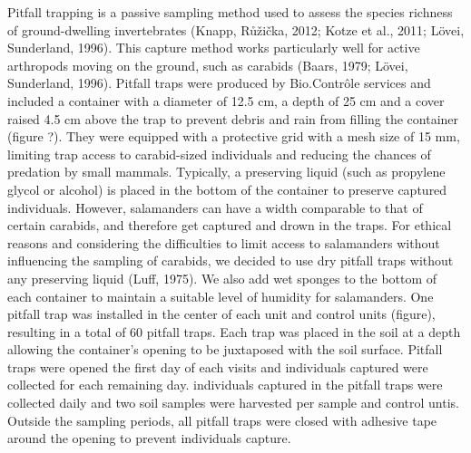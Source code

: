 Pitfall trapping is a passive sampling method used to assess the species richness of ground-dwelling invertebrates (Knapp, Růžička, 2012; Kotze et al., 2011; Lövei,  Sunderland, 1996). 
This capture method works particularly well for active arthropods moving on the ground, such as carabids (Baars, 1979; Lövei, Sunderland, 1996). 
Pitfall traps were produced by Bio.Contrôle services and included a container with a diameter of 12.5 cm, a depth of 25 cm and a cover raised 4.5 cm above the trap 
to prevent debris and rain from filling the container (figure ?).
They were equipped with a protective grid with a mesh size of 15 mm, limiting trap access to carabid-sized individuals and reducing the chances of predation by small mammals. 
Typically, a preserving liquid (such as propylene glycol or alcohol) is placed in the bottom of the container to preserve captured individuals. 
However, salamanders can have a width comparable to that of certain carabids, and therefore get captured and drown in the traps. 
For ethical reasons and considering the difficulties to limit access to salamanders without influencing the sampling of carabids, 
we decided to use dry pitfall traps without any preserving liquid (Luff, 1975). 
We also add wet sponges to the bottom of each container to maintain a suitable level of humidity for salamanders.
One pitfall trap was installed in the center of each unit and control units (figure), resulting in a total of 60 pitfall traps. 
Each trap was placed in the soil at a depth allowing the container's opening to be juxtaposed with the soil surface. 
Pitfall traps were opened the first day of each visits and individuals captured were collected for each remaining day.
individuals captured in the pitfall traps were collected daily and two soil samples were harvested per sample and control untis.
Outside the sampling periods, all pitfall traps were closed with adhesive tape around the opening to prevent individuals capture. 

